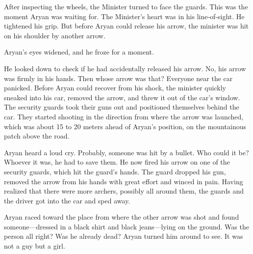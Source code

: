 After inspecting the wheels, the Minister turned to face the guards. This was
the moment Aryan was waiting for. The Minister's heart was in his line-of-sight.
He tightened his grip. But before Aryan could release his arrow, the minister
was hit on his shoulder by another arrow.

Aryan's eyes widened, and he froze for a moment.

He looked down to check if he had accidentally released his arrow. No, his arrow
was firmly in his hands. Then whose arrow was that? Everyone near the car
panicked. Before Aryan could recover from his shock, the minister quickly
sneaked into his car, removed the arrow, and threw it out of the car's window.
The security guards took their guns out and positioned themselves behind the
car. They started shooting in the direction from where the arrow was launched,
which was about 15 to 20 meters ahead of Aryan's position, on the mountainous
patch above the road.

Aryan heard a loud cry. Probably, someone was hit by a bullet. Who could it be?
Whoever it was, he had to save them. He now fired his arrow on one of the
security guards, which hit the guard's hands. The guard dropped his gun, removed
the arrow from his hands with great effort and winced in pain. Having realized
that there were more archers, possibly all around them, the guards and the
driver got into the car and sped away.

Aryan raced toward the place from where the other arrow was shot and found
someone—dressed in a black shirt and black jeans—lying on the ground. Was
the person all right? Was he already dead? Aryan turned him around to see. It
was not a guy but a girl.
